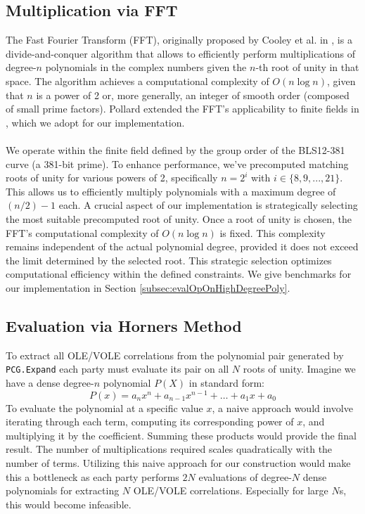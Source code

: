 \subsection{Multiplication via FFT}
\label{subsec:multviaFFT}
The Fast Fourier Transform (FFT), originally proposed by Cooley et al. in \cite{cooley1965algorithm}, is a divide-and-conquer algorithm that allows to efficiently perform multiplications of degree-$n$ polynomials in the complex numbers given the $n$-th root of unity in that space. The algorithm achieves a computational complexity of $O(n\log n)$, given that $n$ is a power of 2 or, more generally, an integer of smooth order (composed of small prime factors). Pollard extended the FFT's applicability to finite fields in \cite{pollard1971fast}, which we adopt for our implementation. 
\\\\
We operate within the finite field defined by the group order of the BLS12-381 curve (a 381-bit prime). To enhance performance, we've precomputed matching roots of unity for various powers of 2, specifically $n=2^i$ with $i \in \{8, 9, ..., 21\}$. This allows us to efficiently multiply polynomials with a maximum degree of $(n/2)-1$ each. A crucial aspect of our implementation is strategically selecting the most suitable precomputed root of unity. Once a root of unity is chosen, the FFT's computational complexity of $O(n \log n)$ is fixed. This complexity remains independent of the actual polynomial degree, provided it does not exceed the limit determined by the selected root. This strategic selection optimizes computational efficiency within the defined constraints. We give benchmarks for our implementation in Section \ref{subsec:evalOpOnHighDegreePoly}.

\subsection{Evaluation via Horners Method}
\label{subsec:horner}
To extract all OLE/VOLE correlations from the polynomial pair generated by \texttt{PCG.Expand} each party must evaluate its pair on all $N$ roots of unity. Imagine we have a dense degree-$n$ polynomial $P(X)$ in standard form:
$$
P(x) = a_n x^n + a_{n-1} x^{n-1} + \dots + a_1 x + a_0
$$
To evaluate the polynomial at a specific value $x$, a naive approach would involve iterating through each term, computing its corresponding power of $x$, and multiplying it by the coefficient. Summing these products would provide the final result. The number of multiplications required scales quadratically with the number of terms. Utilizing this naive approach for our construction would make this a bottleneck as each party performs $2N$ evaluations of degree-$N$ dense polynomials for extracting $N$ OLE/VOLE correlations. Especially for large $N$s, this would become infeasible.


